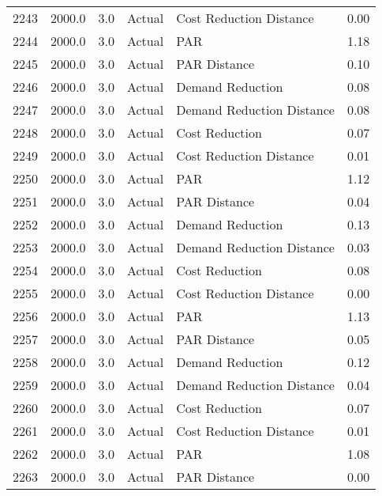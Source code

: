 \begin{longtable}{lrrllr}
2243 &       2000.0 &     3.0 &         Actual &    Cost Reduction Distance &   0.00 \\
2244 &       2000.0 &     3.0 &         Actual &                        PAR &   1.18 \\
2245 &       2000.0 &     3.0 &         Actual &               PAR Distance &   0.10 \\
2246 &       2000.0 &     3.0 &         Actual &           Demand Reduction &   0.08 \\
2247 &       2000.0 &     3.0 &         Actual &  Demand Reduction Distance &   0.08 \\
2248 &       2000.0 &     3.0 &         Actual &             Cost Reduction &   0.07 \\
2249 &       2000.0 &     3.0 &         Actual &    Cost Reduction Distance &   0.01 \\
2250 &       2000.0 &     3.0 &         Actual &                        PAR &   1.12 \\
2251 &       2000.0 &     3.0 &         Actual &               PAR Distance &   0.04 \\
2252 &       2000.0 &     3.0 &         Actual &           Demand Reduction &   0.13 \\
2253 &       2000.0 &     3.0 &         Actual &  Demand Reduction Distance &   0.03 \\
2254 &       2000.0 &     3.0 &         Actual &             Cost Reduction &   0.08 \\
2255 &       2000.0 &     3.0 &         Actual &    Cost Reduction Distance &   0.00 \\
2256 &       2000.0 &     3.0 &         Actual &                        PAR &   1.13 \\
2257 &       2000.0 &     3.0 &         Actual &               PAR Distance &   0.05 \\
2258 &       2000.0 &     3.0 &         Actual &           Demand Reduction &   0.12 \\
2259 &       2000.0 &     3.0 &         Actual &  Demand Reduction Distance &   0.04 \\
2260 &       2000.0 &     3.0 &         Actual &             Cost Reduction &   0.07 \\
2261 &       2000.0 &     3.0 &         Actual &    Cost Reduction Distance &   0.01 \\
2262 &       2000.0 &     3.0 &         Actual &                        PAR &   1.08 \\
2263 &       2000.0 &     3.0 &         Actual &               PAR Distance &   0.00 \\

\end{longtable}
